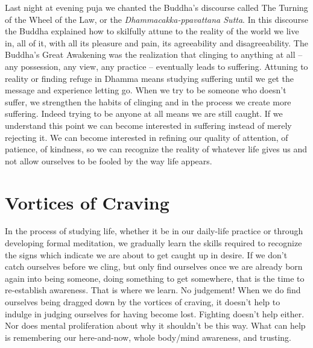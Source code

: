 Last night at evening puja we chanted the Buddha’s discourse called
The Turning of the Wheel of the Law, or the \emph{Dhammacakka-ppavattana
Sutta}. In this discourse the Buddha explained how to skilfully attune
to the reality of the world we live in, all of it, with all its pleasure
and pain, its agreeability and disagreeability. The Buddha’s Great
Awakening was the realization that clinging to anything at all – any
possession, any view, any practice – eventually leads to suffering.
Attuning to reality or finding refuge in Dhamma means studying suffering
until we get the message and experience letting go. When we try to be
someone who doesn’t suffer, we strengthen the habits of clinging and in
the process we create more suffering. Indeed trying to be anyone at all
means we are still caught. If we understand this point we can become
interested in suffering instead of merely rejecting it. We can become
interested in refining our quality of attention, of patience, of
kindness, so we can recognize the reality of whatever life gives us and
not allow ourselves to be fooled by the way life appears.

\section{Vortices of Craving}

In the process of studying life, whether it be in our daily-life
practice or through developing formal meditation, we gradually learn the
skills required to recognize the signs which indicate we are about to
get caught up in desire. If we don’t catch ourselves before we cling,
but only find ourselves once we are already born again into being
someone, doing something to get somewhere, that is the time to
re-establish awareness. That is where we learn. No judgement! When we do
find ourselves being dragged down by the vortices of craving, it doesn’t
help to indulge in judging ourselves for having become lost. Fighting
doesn’t help either. Nor does mental proliferation about why it
shouldn’t be this way. What can help is remembering our here-and-now,
whole body/mind awareness, and trusting.


